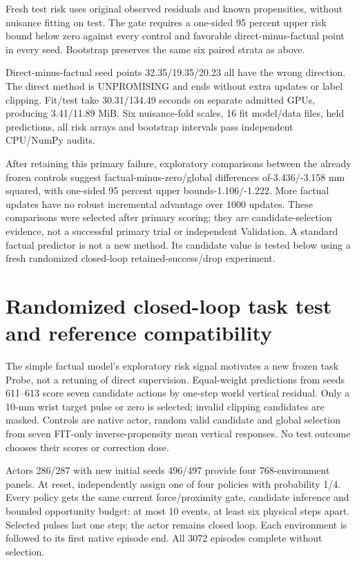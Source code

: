 \documentclass[10 pt]{article}
\begin{document}
Fresh test risk uses original observed residuals and known propensities, without
nuisance fitting on test. The gate requires a one-sided 95 percent upper risk bound
below zero against every control and favorable direct-minus-factual point in every
seed. Bootstrap preserves the same six paired strata as above.

\begin{table}[h]
\centering

\caption{Direct randomized learner minus each frozen control, mm squared; every fixed gate fails.}
\end{table}

Direct-minus-factual seed points 32.35/19.35/20.23 all have the wrong direction.
The direct method is UNPROMISING and ends without extra updates or label clipping.
Fit/test take 30.31/134.49 seconds on separate admitted GPUs, producing 3.41/11.89 MiB.
Six nuisance-fold scales, 16 fit model/data files, held predictions, all risk arrays
and bootstrap intervals pass independent CPU/NumPy audits.

After retaining this primary failure, exploratory comparisons between the already
frozen controls suggest factual-minus-zero/global differences of-3.436/-3.158 mm
squared, with one-sided 95 percent upper bounds-1.106/-1.222. More factual updates
have no robust incremental advantage over 1000 updates. These comparisons were
selected after primary scoring; they are candidate-selection evidence, not a
successful primary trial or independent Validation. A standard factual predictor
is not a new method. Its candidate value is tested below using a fresh randomized
closed-loop retained-success/drop experiment.

\section{Randomized closed-loop task test and reference compatibility}
The simple factual model's exploratory risk signal motivates a new frozen task
Probe, not a retuning of direct supervision. Equal-weight predictions from
seeds 611--613 score seven candidate actions by one-step world vertical residual.
Only a 10-mm wrist target pulse or zero is selected; invalid clipping candidates
are masked. Controls are native actor, random valid candidate and global selection
from seven FIT-only inverse-propensity mean vertical responses. No test outcome
chooses their scores or correction dose.

Actors 286/287 with new initial seeds 496/497 provide four 768-environment panels.
At reset, independently assign one of four policies with probability 1/4. Every
policy gets the same current force/proximity gate, candidate inference and bounded
opportunity budget: at most 10 events, at least six physical steps apart. Selected
pulses last one step; the actor remains closed loop. Each environment is followed
to its first native episode end. All 3072 episodes complete without selection.
\end{document}
